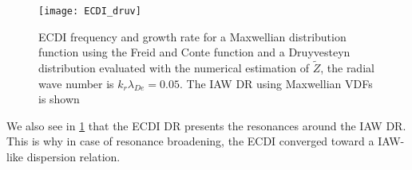   \begin{figure}[!hbt]
    \centering
    \texttt{[image: ECDI\_druv]}
    \caption{\acs{ECDI} frequency and growth rate for a Maxwellian distribution function using the Freid and Conte function and a Druyvesteyn distribution evaluated with the numerical estimation of $\tilde{Z}$, the radial wave number is $k_r \lambda_{De} = 0.05$. The \acs{IAW} \acs{DR} using Maxwellian VDFs is shown }
    \label{fig-ECDI_druv}
  \end{figure}

  We also see in \cref{fig-ECDI_druv} that the \ac{ECDI} \ac{DR} presents the resonances around the \ac{IAW} \ac{DR}.
  This is why in case of resonance broadening, the \ac{ECDI} converged toward a \ac{IAW}-like dispersion relation.

\let\rightmark=\oldrightmark
